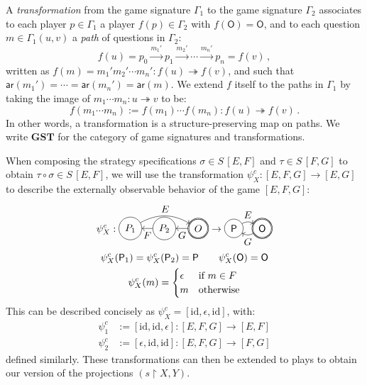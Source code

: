 \documentclass[format=sigplan,authordraft]{acmart}
\newcommand{\kw}[1]{\ensuremath{ \mathsf{#1} }}
\begin{document}
\begin{definition}
A \emph{transformation}
from the game signature $\Gamma_1$
to the game signature $\Gamma_2$
associates to each player $p \in \Gamma_1$ a player $f(p) \in \Gamma_2$
with $f(\kw{O}) = \kw{O}$,
and to each question $m \in \Gamma_1(u,v)$
a \emph{path} of questions in $\Gamma_2$:
\[
  f(u) = p_0 \xrightarrow{m_1'} p_1 \xrightarrow{m_2'} \cdots
             \xrightarrow{m_n'} p_n = f(v) \,,
\]
written as
$f(m) = m_1' m_2' \cdots m_n' : f(u) \twoheadrightarrow f(v)$, and
such that
$\kw{ar}(m_1') = \cdots = \kw{ar}(m_n') = \kw{ar}(m)$.
We extend $f$ itself to the paths in $\Gamma_1$
by taking the image of $m_1 \cdots m_n : u \twoheadrightarrow v$
to be:
\[
  f(m_1 \cdots m_n) := f(m_1) \cdots f(m_n) :
    f(u) \twoheadrightarrow f(v) \,.
\]
In other words,
a transformation
is a structure-preserving map on paths.
We write $\mathbf{GST}$ for the category of
game signatures and transformations.
\end{definition}

When composing the strategy specifications
$\sigma \in S \, [E, F]$ and
$\tau \in S \, [F, G]$
to obtain $\tau \circ \sigma \in S \, [E, F]$,
we will use the transformation
$\psi^c_X : [E,F,G] \rightarrow [E,G]$
to describe the externally observable behavior
of the game $[E,F,G]$:
\begin{gather*}
  \psi^c_X :
  \begin{tikzpicture}[baseline=(O.base),scale=1.2]
    \node[circle,double,draw] (O) at (1,0) {$O$};
    \node[circle,draw] (P2) at (0,0) {$P_2$};
    \node[circle,draw] (P1) at (-1,0) {$P_1$};
    \path[->] (O) edge node[below] {$G$} (P2);
    \path[->] (P2) edge node[below] {$F$} (P1);
    \path[->] (P1) edge[bend left] node[above] {$E$} (O);
  \end{tikzpicture}
  \rightarrow
  \begin{tikzpicture}[baseline=(O.base)]
    \node[circle,draw,double] (O) at (0,0) {$\kw{O}$};
    \node[circle,draw] (P) at (-1,0) {$\kw{P}$};
    \path[->] (P) edge[bend left] node[above] {$E$} (O);
    \path[->] (O) edge[bend left] node[below] {$G$} (P);
  \end{tikzpicture}
  \\
  \psi^c_X(\kw{P}_1) = \psi^c_X(\kw{P}_2) = \kw{P} \qquad
  \psi^c_X(\kw{O}) = \kw{O}
  \\
  \psi^c_X(m) = \begin{cases}
    \epsilon & \text{if } m \in F \\
    m & \text{otherwise}
  \end{cases}
\end{gather*}
This can be described concisely as
$\psi^c_X = [\mathrm{id}, \epsilon, \mathrm{id}]$,
with:
\begin{align*}
  \psi^c_1 &:= [\mathrm{id}, \mathrm{id}, \epsilon] :
    [E,F,G] \rightarrow [E,F] \\
  \psi^c_2 &:= [\epsilon, \mathrm{id}, \mathrm{id}] :
     [E,F,G] \rightarrow [F,G]
\end{align*}
defined similarly.
These transformations can then be extended to plays
to obtain our version of the projections $(s \restriction X,Y)$.
\end{document}
